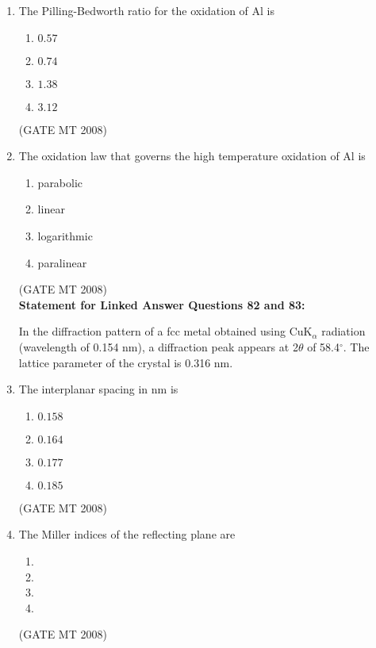 \documentclass[journal, 11pt, onecolumn]{IEEEtran}
\theoremstyle{remark}
\begin{document}
\begin{enumerate}
\item The Pilling-Bedworth ratio for the oxidation of Al is
\begin{multicols}{4}
\begin{enumerate} 
\item $0.57$
\item $0.74$
\item $1.38$
\item $3.12$
\end{enumerate}
\end{multicols}
\hfill(GATE MT 2008)
\item The oxidation law that governs the high temperature oxidation of Al is
\vspace{-0.9em}
\begin{multicols}{4}
\begin{enumerate} 
\item parabolic
\item linear
\item logarithmic
\item paralinear
\end{enumerate}
\end{multicols}
\hfill(GATE MT 2008)\\


\textbf{Statement for Linked Answer Questions 82 and 83:}

In the diffraction pattern of a fcc metal obtained using CuK$_\alpha$ radiation (wavelength of 0.154 nm), 
a diffraction peak appears at 2$\theta$ of 58.4$^\circ$. The lattice parameter of the crystal is 0.316 nm.

\item The interplanar spacing in nm is

\begin{multicols}{4}
\begin{enumerate} 
\item $0.158$
\item $0.164$
\item $0.177$
\item $0.185$
\end{enumerate}
\end{multicols}

\hfill(GATE MT 2008)

\item The Miller indices of the reflecting plane are
\vspace{-0.9em}
\begin{multicols}{4}
\begin{enumerate} 
\item {}
\item {}
\item {}
\item {}
\end{enumerate}
\end{multicols}
\hfill(GATE MT 2008)\\




\end{enumerate}
\end{document}
